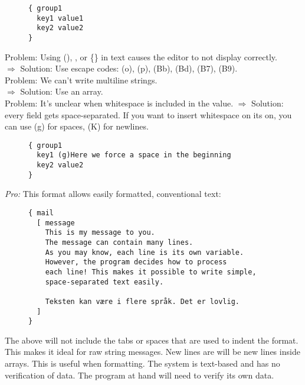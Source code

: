 \documentclass[listof=totoc]{article}
\begin{document}
\begin{figure}[H]
\centering
\begin{varwidth}{\linewidth}
\begin{verbatim}
{ group1
  key1 value1
  key2 value2
}
\end{verbatim}
\end{varwidth}
\caption{}
\end{figure}

\noindent Problem: Using (), \lbrack \rbrack, or \{\} in text causes the editor to not display correctly. \\
$\Rightarrow$ Solution: Use escape codes: (o), (p), (Bb), (Bd), (B7), (B9). \\
\noindent Problem: We can't write multiline strings. \\
$\Rightarrow$ Solution: Use an array. \\
\noindent Problem: It's unclear when whitespace is included in the value.
$\Rightarrow$ Solution: every field gets space-separated. If you want to insert
whitespace on its on, you can use (g) for spaces, (K) for newlines.


\begin{figure}[H]
\centering
\begin{varwidth}{\linewidth}
\begin{verbatim}
{ group1
  key1 (g)Here we force a space in the beginning
  key2 value2
}
\end{verbatim}
\end{varwidth}
\caption{}
\end{figure}

\textit{Pro:} This format allows easily formatted, conventional text:

\begin{figure}[H]
\centering
\begin{varwidth}{\linewidth}
\begin{verbatim}
{ mail
  [ message
    This is my message to you.
    The message can contain many lines.
    As you may know, each line is its own variable.
    However, the program decides how to process
    each line! This makes it possible to write simple,
    space-separated text easily.

    Teksten kan være i flere språk. Det er lovlig.
  ]
}
\end{verbatim}
\end{varwidth}
\caption{}
\end{figure}

\noindent The above will not include the tabs or spaces that are used to indent the format. This makes it ideal for raw string messages. New lines are will be new lines inside arrays. This is useful when formatting. The system is text-based and has no verification of data.
The program at hand will need to verify its own data.
\end{document}

